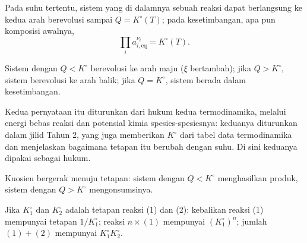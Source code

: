 \begin{theorem}\label{thm:b1:extent-q-and-k:mass-action}
Pada suhu tertentu, sistem yang di dalamnya sebuah reaksi dapat
berlangsung ke kedua arah berevolusi sampai $Q = K^\circ(T)$; pada
kesetimbangan, apa pun komposisi awalnya,
\[
  \prod_i a_{i,\text{eq}}^{\nu_i} = K^\circ(T) .
\]
\end{theorem}
\admitted

\begin{proposition}\label{prop:b1:extent-q-and-k:direction}
Sistem dengan $Q < K^\circ$ berevolusi ke arah maju ($\xi$ bertambah);
jika $Q > K^\circ$, sistem berevolusi ke arah balik; jika $Q = K^\circ$,
sistem berada dalam kesetimbangan.
\end{proposition}
\admitted

\begin{remark}\label{rem:b1:extent-q-and-k:origin}
Kedua pernyataan itu diturunkan dari hukum kedua termodinamika, melalui
energi bebas reaksi dan potensial kimia spesies-spesiesnya: keduanya
diturunkan dalam jilid Tahun 2, yang juga memberikan $K^\circ$ dari tabel
data termodinamika dan menjelaskan bagaimana tetapan itu berubah dengan
suhu. Di sini keduanya dipakai sebagai hukum.
\end{remark}

\begin{omfigure}

{\small Kuosien bergerak menuju tetapan: sistem dengan $Q <
K^\circ$ menghasilkan produk, sistem dengan $Q > K^\circ$ mengonsumsinya.}
\end{omfigure}

\begin{proposition}\label{prop:b1:extent-q-and-k:combine-k}
Jika $K_1^\circ$ dan $K_2^\circ$ adalah tetapan reaksi (1) dan (2):
kebalikan reaksi (1) mempunyai tetapan $1/K_1^\circ$; reaksi $n \times
(1)$ mempunyai $(K_1^\circ)^n$; jumlah $(1) + (2)$ mempunyai $K_1^\circ K_2^\circ$.
\end{proposition}

